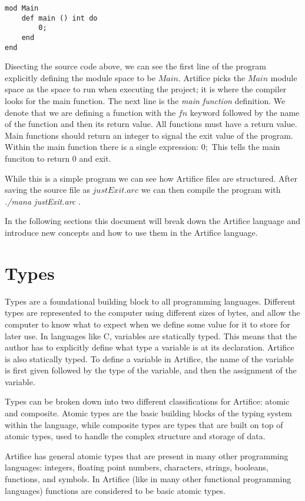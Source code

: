 \documentclass{article}
\begin{document}
\begin{lstlisting}
mod Main
	def main () int do
		0;
	end
end
\end{lstlisting}

Disecting the source code above, we can see the first line of the program explicitly defining the module space to be $Main$. Artifice
picks the $Main$ module space as the space to run when executing the project; it is where the compiler looks for the main function.
The next line is the \textit{main function} definition. We denote that we are defining a function with the $fn$ keyword followed by
the name of the function and then its return value. All functions must have a return value. Main functions should return an integer
to signal the exit value of the program. Within the main function there is a single expression: $0;$ This tells the main funciton
to return $0$ and exit.

While this is a simple program we can see how Artifice files are structured. After saving the source file as $justExit.arc$ we can
then compile the program with \textit{./mana justExit.arc} .

In the following sections this document will break down the Artifice language and introduce new concepts and how to use them in the
Artifice language.


\section{Types}

Types are a foundational building block to all programming languages. Different types are represented to the computer using
different sizes of bytes, and allow the computer to know what to expect when we define some value for it to store for later
use. In languages like C, variables are statically typed. This means that the author has to explicitly define what type a
variable is at its declaration. Artifice is also statically typed. To define a variable in Artifice, the name of the variable is
first given followed by the type of the variable, and then the assignment of the variable.

Types can be broken down into two different classifications for Artifice: atomic and composite. Atomic types are the basic
building blocks of the typing system within the language, while composite types are types that are built on top of atomic
types, used to handle the complex structure and storage of data.

Artifice has general atomic types that are present in many other programming languages: integers, floating point numbers, characters,
strings, booleans, functions, and symbols. In Artifice (like in many other functional programming languages) functions are considered
to be basic atomic types.
\end{document}
